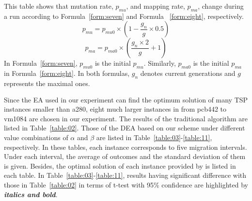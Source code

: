 \documentclass[journal,onecolumn]{IEEEtran}
\begin{document}
%
This table shows that mutation rate, $p_{mu}$, and mapping rate, $p_{ma}$, change during a run according to Formula~\ref{form:seven} and Formula~ \ref{form:eight}, respectively.
\begin{equation}
 p_{mu} = {p_{mu0}} \times (1-\frac{g_n}{g}\times 0.5)
 \label{form:seven}
\end{equation}
\begin{equation}
p_{ma} = {p_{ma0}} \times (\frac{{{g_n} \times 2}}{g} + 1)
\label{form:eight}
\end{equation}
In Formula~\ref{form:seven}, $p_{mu0}$ is the initial $p_{mu}$.
Similarly, $p_{ma0}$ is the initial $p_{ma}$ in Formula~\ref{form:eight}.
In both formulas, $g_n$ denotes current generations and $g$ represents the maximal ones.

Since the EA used in our experiment can find the optimum solution of many TSP instances smaller than a280, eight much larger instances in \cite{reinelt1991tsplib} from pcb442 to vm1084 are chosen in our experiment.
The results of the traditional algorithm are listed in Table~\ref{table:02}.
Those of the DEA based on our scheme under different value combinations of $\alpha$ and $\beta$ are listed in Table~\ref{table:03}-\ref{table:11}, respectively.
In these tables, each instance corresponds to five migration intervals.
Under each interval, the average of outcomes and the standard deviation of them is given.
Besides, the optimal solution of each instance provided by \cite{reinelt1991tsplib} is listed in each table.
In Table~\ref{table:03}-\ref{table:11}, results having significant difference with those in Table~\ref{table:02} in terms of t-test with 95\% confidence are highlighted by \textbf{\emph{italics and bold}}.
\end{document}
